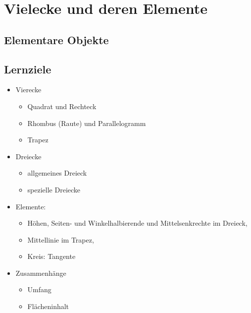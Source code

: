\section{Vielecke und deren Elemente}



\subsection{Elementare Objekte}

\subsection*{Lernziele}

\begin{itemize}
\item Vierecke
  \begin{itemize}
  \item Quadrat und Rechteck
  \item Rhombus (Raute) und Parallelogramm
  \item Trapez
  \end{itemize}
\item Dreiecke
  \begin{itemize}
  \item allgemeines Dreieck
  \item spezielle Dreiecke
  \end{itemize}

\item Elemente:
  \begin{itemize}
  \item Höhen, Seiten- und Winkelhalbierende und
    Mittelsenkrechte im Dreieck,
  \item Mittellinie im Trapez,
  \item Kreis: Tangente
  \end{itemize}
\item Zusammenhänge
  \begin{itemize}
  \item
    Umfang
  \item
    Flächeninhalt 
  \end{itemize}

\end{itemize}

